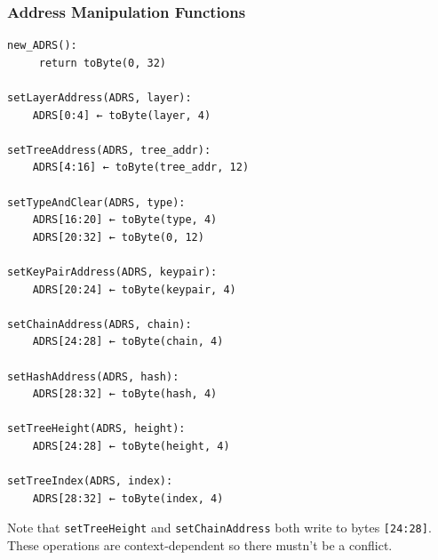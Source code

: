 \subsubsection{Address Manipulation Functions}
\begin{verbatim}
new_ADRS():
     return toByte(0, 32)

setLayerAddress(ADRS, layer):
    ADRS[0:4] ← toByte(layer, 4)

setTreeAddress(ADRS, tree_addr):
    ADRS[4:16] ← toByte(tree_addr, 12)

setTypeAndClear(ADRS, type):
    ADRS[16:20] ← toByte(type, 4)
    ADRS[20:32] ← toByte(0, 12)

setKeyPairAddress(ADRS, keypair):
    ADRS[20:24] ← toByte(keypair, 4)

setChainAddress(ADRS, chain):
    ADRS[24:28] ← toByte(chain, 4)

setHashAddress(ADRS, hash):
    ADRS[28:32] ← toByte(hash, 4)

setTreeHeight(ADRS, height):
    ADRS[24:28] ← toByte(height, 4)

setTreeIndex(ADRS, index):
    ADRS[28:32] ← toByte(index, 4)
\end{verbatim}

Note that \texttt{setTreeHeight} and \texttt{setChainAddress} both write to bytes \texttt{[24:28]}. These operations are context-dependent so there mustn't be a conflict.

